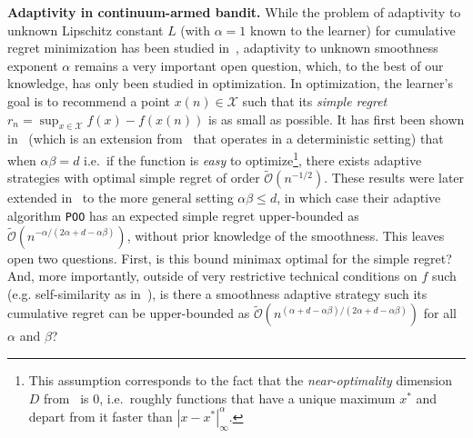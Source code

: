 \documentclass[final,12pt]{colt2018}
\newcommand{\tildeO}[1]{\tilde{\mathcal O}\left( #1 \right)}
\begin{document}
\noindent\textbf{Adaptivity in continuum-armed bandit.} While the problem of adaptivity to unknown Lipschitz constant $L$ (with $\alpha = 1$ known to the learner) for cumulative regret minimization has been studied in~\cite{bubeck2011lipschitz}, adaptivity to unknown smoothness exponent $\alpha$ remains a very important open question, which, to the best of our knowledge, has only been studied in optimization. In optimization, the learner's goal is to recommend a point $x(n) \in \mathcal X$ such that its \emph{simple regret} $r_n = \sup_{x\in \mathcal X}f(x) - f(x(n))$ is as small as possible. It has first been shown in~\cite{valko2013stochastic} (which is an extension from~\cite{munos2011optimistic} that operates in a deterministic setting) that when $\alpha\beta = d$ i.e.~if the function is \emph{easy} to optimize\footnote{This assumption corresponds to the fact that the \emph{near-optimality} dimension $D$ from~\cite{bubeck2011x} is $0$, i.e.~roughly functions that have a unique maximum $x^*$ and depart from it faster than $|x - x^*|_\infty^\alpha$.}, there exists adaptive strategies with optimal simple regret of order $\tildeO{n^{-1/2}}$. These results were later extended in~\cite{grill2015black} to the more general setting $\alpha\beta \leq d$, in which case their adaptive algorithm \texttt{POO} has an expected simple regret upper-bounded as $\tildeO{n^{-\alpha/(2\alpha+d-\alpha\beta)}}$, without prior knowledge of the smoothness. This leaves open two questions. First, is this bound minimax optimal for the simple regret? And, more importantly, outside of very restrictive technical conditions on $f$ such (e.g. self-similarity as in~\cite{minsker2013estimation}), is there a smoothness adaptive strategy such its cumulative regret can be upper-bounded as $\tildeO{n^{(\alpha+d-\alpha\beta)/(2\alpha+d-\alpha\beta)}}$ for all $\alpha$ and $\beta$?
\end{document}
